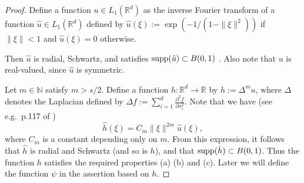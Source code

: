 \documentclass[11pt]{article}
\theoremstyle{remark}
\theoremstyle{example}
\theoremstyle{remark}
\newcommand{\R}{\mathbb{R}}
\newcommand{\citep}{\cite}
\newcommand{\citealp}{\cite}
\begin{document}
\begin{proof}
Define a function $u \in L_1(\R^d)$ as the inverse Fourier transform of a function $\hat{u} \in L_1(\R^d)$ defined by $\hat{u}(\xi) := \exp \left(- 1 / (1- \| \xi \|^2) \right)$ if $\| \xi \| < 1$ and $\hat{u}(\xi) = 0$ otherwise.
\begin{comment}
\[
\hat{u}(\xi) := 
\begin{cases} 
\exp \left(- \frac{1}{1- \| \xi \|} \right), \quad {\rm if}\ \| \xi \| < 1 \\
0, \quad {\rm otherwise}
\end{cases}.
\]
\end{comment}
Then $\hat{u}$ is radial, Schwartz, and satisfies ${\rm supp}(\hat{u}) \subset B(0,1)$ \citep[Sec.~2.28]{AdaFou03}.
Also note that $u$ is real-valued, since $\hat{u}$ is symmetric.

Let $m \in \mathbb{N}$ satisfy $m > s/2$.
Define a function $h: \R^d \to \R$ by 
$h := \Delta^m u$,
 where $\Delta$ denotes the Laplacian defined by $\Delta f := \sum_{i=1}^d \frac{\partial^2 f}{\partial x_i^2} $.
Note that we have (see e.g.~p.117 of \citealp{Ste70})
\begin{equation} \label{eq:laplacian_fourier_199}
\hat{h}(\xi) = C_m \| \xi \|^{2m} \hat{u}(\xi),
\end{equation}
where $C_m$ is a constant depending only on $m$. 
From this expression, it follows that $\hat{h}$ is radial and Schwartz (and so is $h$),  and that ${\rm supp}(\hat{h}) \subset B(0,1)$. 
Thus the function $h$ satisfies the required properties (a) (b) and (c).
Later we will define the function $\psi$ in the assertion based on $h$.


\end{proof}
\end{document}
